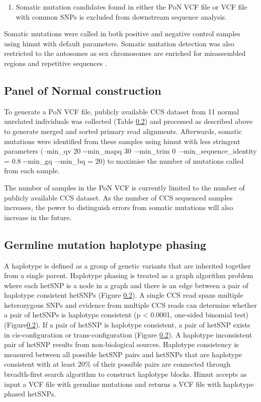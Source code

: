 \begin{enumerate}
\item Somatic mutation candidates found in either the PoN VCF file or VCF file with common SNPs is excluded from downstream sequence analysis. 
\end{enumerate}

Somatic mutations were called in both positive and negative control samples using himut with default parameters. Somatic mutation detection was also restricted to the autosomes as sex chromosomes are enriched for misassembled regions and repetitive sequences \cite{Skaletsky2003-sr}.


\subsection{Panel of Normal construction}

To generate a PoN VCF file, publicly available CCS dataset from 11 normal unrelated individuals was collected \cite{Zook2019-pm} (Table \ref{}) and processed as described above to generate merged and sorted primary read alignments. Afterwards, somatic mutations were identified from these samples using himut with less stringent parameters (--min\_qv 20 -{}-min\_mapq 30 –{}-min\_trim 0 –{}-min\_sequence\_identity = 0.8 -{}-min\_gq –{}-min\_bq = 20) to maximise the number of mutations called from each sample. 


The number of samples in the PoN VCF is currently limited to the number of publicly available CCS dataset. As the number of CCS sequenced samples increases, the power to distinguish errors from somatic mutations will also increase in the future.  

\subsection{Germline mutation haplotype phasing}

A haplotype is defined as a group of genetic variants that are inherited together from a single parent. Haplotype phasing is treated as a graph algorithm problem where each hetSNP is a node in a graph and there is an edge between a pair of haplotype consistent hetSNPs (Figure \ref{}). A single CCS read spans multiple heterozygous SNPs and evidence from multiple CCS reads can determine whether a pair of hetSNPs is haplotype consistent (p < 0.0001, one-sided binomial test) (Figure\ref{}). If a pair of hetSNP is haplotype consistent, a pair of hetSNP exists in cis-configuration or trans-configuration (Figure \ref{}). A haplotype inconsistent pair of hetSNP results from non-biological sources. Haplotype consistency is measured between all possible hetSNP pairs and hetSNPs that are haplotype consistent with at least 20\% of their possible pairs are connected through breadth-first search algorithm to construct haplotype blocks. Himut accepts as input a VCF file with germline mutations and returns a VCF file with haplotype phased hetSNPs.

